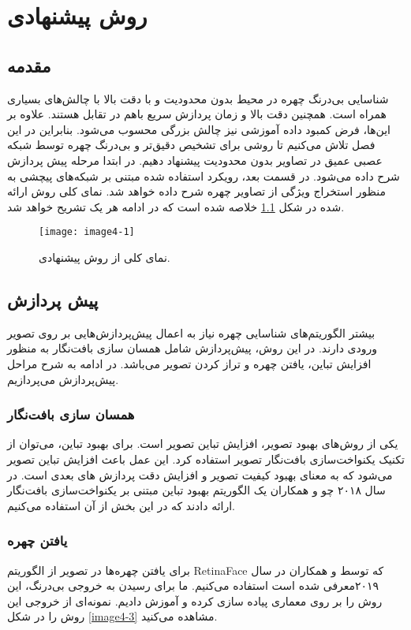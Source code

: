 \chapter{ روش پیشنهادی }
\section{مقدمه}

شناسایی بی‌درنگ چهره در محیط بدون محدودیت و با دقت بالا با چالش‌های بسیاری همراه است. همچنین دقت بالا و زمان پردازش سریع باهم در تقابل هستند. علاوه بر این‌ها، فرض ‌کمبود داده آموزشی نیز چالش بزرگی محسوب می‌شود. بنابراین در این فصل تلاش می‌کنیم تا روشی برای تشخیص دقیق‌تر و بی‌درنگ چهره توسط شبکه عصبی عمیق در تصاویر بدون محدودیت پیشنهاد دهیم. در ابتدا مرحله پیش پردازش شرح داده می‌شود. در قسمت بعد، رویكرد استفاده شده مبتنی بر شبكه‌های پیچشی به منظور استخراج ویژگی از تصاویر چهره شرح داده خواهد شد. نمای کلی روش ارائه شده در شكل \ref{image4-1} خلاصه شده است كه در ادامه هر یک تشریح خواهد شد.

\begin{figure}[h]
	\label{image4-1}
	\centering
  	\texttt{[image: image4-1]}
  	\caption{نمای کلی از روش پیشنهادی.}
\end{figure}

\section{پیش پردازش}
بیشتر الگوریتم‌ها‌ی شناسایی چهره نیاز به اعمال پیش‌پردازش‌هایی بر روی تصویر ورودی دارند. در این روش، پیش‌پردازش شامل همسان سازی بافت‌نگار به منظور افزایش تباین، یافتن چهره و تراز کردن تصویر می‌باشد. در ادامه به شرح مراحل پیش‌پردازش می‌پردازیم.
\subsection{همسان سازی بافت‌نگار}
یکی از روش‌های بهبود تصویر، افزایش تباین تصویر است. برای بهبود تباین، می‌توان از تکنیک یکنواخت‌سازی بافت‌نگار تصویر استفاده کرد. این عمل باعث افزایش تباین تصویر  می‌شود که به معنای بهبود کیفیت تصویر و افزایش دقت پردازش های بعدی است. در سال ۲۰۱۸ چو و همکاران \cite{s18092995} یک الگوریتم بهبود تباین مبتنی بر یکنواخت‌سازی بافت‌نگار ارائه دادند که در این بخش از آن استفاده می‌کنیم.

\subsection{یافتن چهره}
برای یافتن چهره‌ها در تصویر از الگوریتم RetinaFace که توسط  و همکاران \cite{deng2019retinaface} در سال ۲۰۱۹معرفی شده است استفاده می‌کنیم. ما برای رسیدن به خروجی بی‌درنگ، این روش را بر روی معماری  پیاده سازی کرده و آموزش دادیم. نمونه‌ای از خروجی این روش را در شکل \ref{image4-3} مشاهده می‌کنید. 

